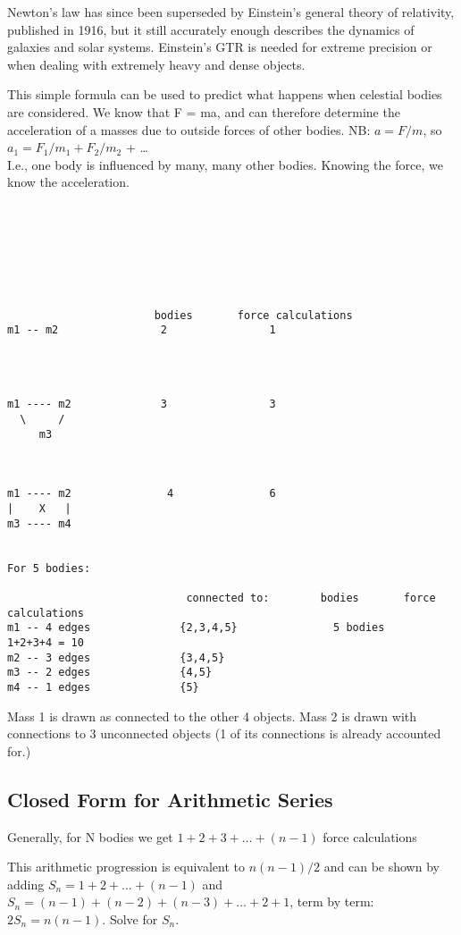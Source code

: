 \documentclass[14pt]{article} %
\begin{document}
Newton's law has since been superseded by Einstein's general theory of relativity, published in 1916, but it still accurately enough describes the dynamics of galaxies and solar systems.  Einstein's GTR is needed for extreme precision or when dealing with extremely heavy and dense objects.

This simple formula can be used to predict what happens when celestial bodies are considered.  We know that F = ma, and can therefore determine the acceleration of a masses due to outside forces of other bodies. NB: $a = F/m$, so $a_1 = F_1/m_1 + F_2/m_2$ +  \ldots  \\   I.e., one body is influenced by many, many other bodies.  Knowing the force, we know the acceleration.





\begin{verbatim}






 
                       bodies       force calculations
m1 -- m2                2                1


  

m1 ---- m2              3                3
  \     /
     m3



m1 ---- m2               4               6
|    X   |
m3 ---- m4


For 5 bodies:

                            connected to:        bodies       force calculations
m1 -- 4 edges              {2,3,4,5}               5 bodies        1+2+3+4 = 10    
m2 -- 3 edges              {3,4,5}
m3 -- 2 edges              {4,5}
m4 -- 1 edges              {5}

\end{verbatim}

Mass 1 is drawn as connected to the other 4  objects.  Mass 2 is drawn with connections to 3 unconnected objects (1 of its connections is already accounted for.)

\subsection{Closed Form for Arithmetic Series}
Generally, for N bodies we get   $1 + 2 + 3 + \ldots + (n-1)$  force calculations

This arithmetic progression is equivalent to $n(n-1)/2$ and can be shown by adding $S_n = 1 + 2+ \ldots +(n-1)$ and
$S_n = (n-1) + (n-2) + (n-3) + \ldots + 2 + 1$, term by term:  $2S_n = n(n-1)$.  Solve for $S_n$.
\end{document}
